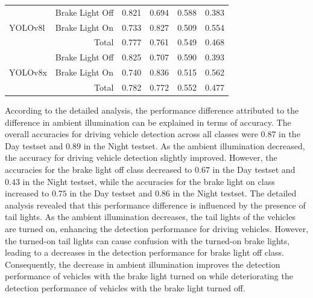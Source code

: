 \begin{table}[!h]
\begin{tabular}{llcccc}
    \midrule
    \multirow{3}{*}{YOLOv8l}                   & Brake Light Off                            & 0.821          & 0.694                     & 0.588          & 0.383                     \\
                                           & Brake Light On                             & 0.733                   & 0.827            & 0.509                   & 0.554            \\
                                           & \multicolumn{1}{r}{Total}                  & 0.777          & 0.761                     & 0.549          & 0.468                    \\
    \midrule
    \multirow{3}{*}{YOLOv8x}                   & Brake Light Off                            & 0.825          & 0.707                     & 0.590          & 0.393                     \\
                                           & Brake Light On                             & 0.740                   & 0.836            & 0.515                   & 0.562            \\
                                           & \multicolumn{1}{r}{Total}                  & 0.782          & 0.772                     & 0.552          & 0.477                    \\
    \bottomrule
    \end{tabular}%
\end{table}



According to the detailed analysis, the performance difference attributed to the difference in ambient illumination can be explained in terms of accuracy.
The overall accuracies for driving vehicle detection across all classes were $0.87$ in the Day testset and $0.89$ in the Night testset.
As the ambient illumination decreased, the accuracy for driving vehicle detection slightly improved.
However, the accuracies for the brake light off class decreased to $0.67$ in the Day testset and $0.43$ in the Night testset, while the accuracies for the brake light on class increased to $0.75$ in the Day testset and $0.86$ in the Night testset.
The detailed analysis revealed that this performance difference is influenced by the presence of tail lights.
As the ambient illumination decreases, the tail lights of the vehicles are turned on, enhancing the detection performance for driving vehicles.
However, the turned-on tail lights can cause confusion with the turned-on brake lights, leading to a decreases in the detection performance for brake light off class.
Consequently, the decrease in ambient illumination improves the detection performance of vehicles with the brake light turned on while deteriorating the detection performance of vehicles with the brake light turned off.


